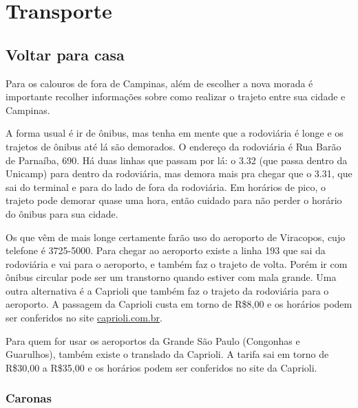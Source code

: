 
\section{Transporte}
\subsection{Voltar para casa}

Para os calouros de fora de Campinas, além de escolher a nova morada é
importante recolher informações sobre como realizar o trajeto entre sua cidade e
Campinas.

A forma usual é ir de ônibus, mas tenha em mente que a rodoviária é longe e os
trajetos de ônibus até lá são demorados. O endereço da rodoviária é Rua Barão de
Parnaíba, 690. Há duas linhas que passam por lá: o 3.32 (que passa dentro da
Unicamp) para dentro da rodoviária, mas demora mais pra chegar que o 3.31, que
sai do terminal e para do lado de fora da rodoviária. Em horários de pico, o
trajeto pode demorar quase uma hora, então cuidado para não perder o horário do
ônibus para sua cidade.

Os que vêm de mais longe certamente farão uso do aeroporto de Viracopos, cujo
telefone é 3725-5000. Para chegar ao aeroporto existe a linha 193 que sai da
rodoviária e vai para o aeroporto, e também faz o trajeto de volta. Porém ir com
ônibus circular pode ser um transtorno quando estiver com mala grande. Uma outra
alternativa é a Caprioli que também faz o trajeto da rodoviária para o
aeroporto. A passagem da Caprioli custa em torno de R\$8,00 e os horários podem
ser conferidos no site \url{caprioli.com.br}.

Para quem for usar os aeroportos da Grande São Paulo (Congonhas e Guarulhos),
também existe o translado da Caprioli. A tarifa sai em torno de R\$30,00 a
R\$35,00 e os horários podem ser conferidos no site da Caprioli.

\subsubsection*{Caronas}


